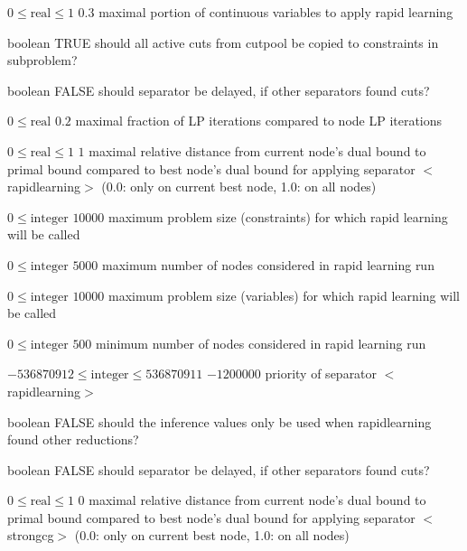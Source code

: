 %
{$0\leq\textrm{real}\leq1$}%
{$0.3$}%
{maximal portion of continuous variables to apply rapid learning}%
{}

%
{boolean}%
{TRUE}%
{should all active cuts from cutpool be copied to constraints in subproblem?}%
{}

%
{boolean}%
{FALSE}%
{should separator be delayed, if other separators found cuts?}%
{}

%
{$0\leq\textrm{real}$}%
{$0.2$}%
{maximal fraction of LP iterations compared to node LP iterations}%
{}

%
{$0\leq\textrm{real}\leq1$}%
{$1$}%
{maximal relative distance from current node's dual bound to primal bound compared to best node's dual bound for applying separator $<$rapidlearning$>$ (0.0: only on current best node, 1.0: on all nodes)}%
{}

%
{$0\leq\textrm{integer}$}%
{$10000$}%
{maximum problem size (constraints) for which rapid learning will be called}%
{}

%
{$0\leq\textrm{integer}$}%
{$5000$}%
{maximum number of nodes considered in rapid learning run}%
{}

%
{$0\leq\textrm{integer}$}%
{$10000$}%
{maximum problem size (variables) for which rapid learning will be called}%
{}

%
{$0\leq\textrm{integer}$}%
{$500$}%
{minimum number of nodes considered in rapid learning run}%
{}

%
{$-536870912\leq\textrm{integer}\leq536870911$}%
{$-1200000$}%
{priority of separator $<$rapidlearning$>$}%
{}

%
{boolean}%
{FALSE}%
{should the inference values only be used when rapidlearning found other reductions?}%
{}

%
{boolean}%
{FALSE}%
{should separator be delayed, if other separators found cuts?}%
{}

%
{$0\leq\textrm{real}\leq1$}%
{$0$}%
{maximal relative distance from current node's dual bound to primal bound compared to best node's dual bound for applying separator $<$strongcg$>$ (0.0: only on current best node, 1.0: on all nodes)}%
{}

